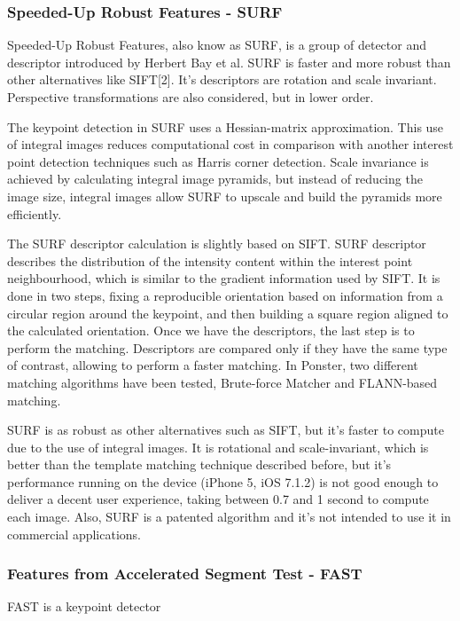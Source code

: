 \subsubsection{Speeded-Up Robust Features - SURF}
Speeded-Up Robust Features, also know as SURF, is a group of detector and descriptor
introduced by Herbert Bay et al. SURF is faster and more robust than other
alternatives like SIFT[2]. It's descriptors are rotation and scale invariant.
Perspective transformations are also considered, but in lower order. 

The keypoint detection in SURF uses a Hessian-matrix approximation. This use of
integral images reduces computational cost in comparison with another interest point
detection techniques such as Harris corner detection. Scale invariance is achieved
by calculating integral image pyramids, but instead of reducing the image size,
integral images allow SURF to upscale and build the pyramids more efficiently. 

The SURF descriptor calculation is slightly based on SIFT. SURF descriptor describes
the distribution of the intensity content within the interest point neighbourhood,
which is similar to the gradient information used by SIFT. It is done in two steps,
fixing a reproducible orientation based on information from a circular region around
the keypoint, and then building a square region aligned to the calculated
orientation. Once we have the descriptors, the last step is to perform the
matching. Descriptors are compared only if they have the same type of contrast,
allowing to perform a faster matching. In Ponster, two different matching algorithms
have been tested, Brute-force Matcher and FLANN-based matching.

SURF is as robust as other alternatives such as SIFT, but it's faster to compute due
to the use of integral images. It is rotational and scale-invariant, which is better
than the template matching technique described before, but it's performance running
on the device (iPhone 5, iOS 7.1.2) is not good enough to deliver a decent user
experience, taking between 0.7 and 1 second to compute each image. Also, SURF is a
patented algorithm and it's not intended to use it in commercial applications. 

\subsubsection{Features from Accelerated Segment Test - FAST}
FAST is a keypoint detector 


